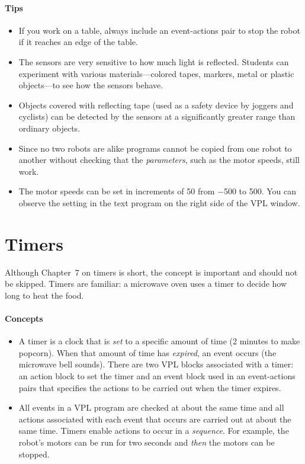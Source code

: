 \documentclass[11pt,a4paper,english]{article}
\begin{document}
\paragraph{Tips}
\begin{itemize}

\item If you work on a table, always include an event-actions pair to
stop the robot if it reaches an edge of the table.

\item The sensors are very sensitive to how much light is reflected.
Students can experiment with various materials---colored tapes, markers,
metal or plastic objects---to see how the sensors behave.

\item Objects covered with reflecting tape (used as a safety device by
joggers and cyclists) can be detected by the sensors at a significantly
greater range than ordinary objects.

\item Since no two robots are alike programs cannot be copied from
one robot to another without checking that the \emph{parameters}, such
as the motor speeds, still work.

\item The motor speeds can be set in increments of 50 from $-$500 to
500. You can observe the setting in the text program on the right side
of the VPL window.

\end{itemize}


\section{Timers}

Although Chapter~7 on timers is short, the concept is important and
should not be skipped. Timers are familiar: a microwave oven uses a
timer to decide how long to heat the food.

\paragraph{Concepts}
\begin{itemize}

\item A timer is a clock that is \emph{set} to a specific amount of time
(2 minutes to make popcorn). When that amount of time has
\emph{expired}, an event occurs (the microwave bell sounds). There are
two VPL blocks associated with a timer: an action block to set the timer
and an event block used in an event-actions pairs that specifies the
actions to be carried out when the timer expires.

\item All events in a VPL program are checked at about the same
time and all actions associated with each event that occurs are carried
out at about the same time. Timers enable actions to occur in a
\emph{sequence}. For example, the robot's motors can be run for two
seconds and \emph{then} the motors can be stopped.

\end{itemize}
\end{document}
